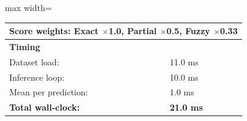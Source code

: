 \begin{table}[htbp]
\begin{adjustbox}{max width=\textwidth}
\begin{tabular}{r p{5cm} r r r r}
\multicolumn{6}{l}{Score weights: Exact $\times$1.0, Partial $\times$0.5, Fuzzy $\times$0.33} \\
\midrule
\multicolumn{6}{l}{\textbf{Timing}} \\
\midrule
\multicolumn{3}{l}{Dataset load:} & \multicolumn{3}{l}{11.0 ms} \\
\multicolumn{3}{l}{Inference loop:} & \multicolumn{3}{l}{10.0 ms} \\
\multicolumn{3}{l}{Mean per prediction:} & \multicolumn{3}{l}{1.0 ms} \\
\multicolumn{3}{l}{\textbf{Total wall-clock:}} & \multicolumn{3}{l}{\textbf{21.0 ms}} \\
\bottomrule
\end{tabular}
\end{adjustbox}
\end{table}
